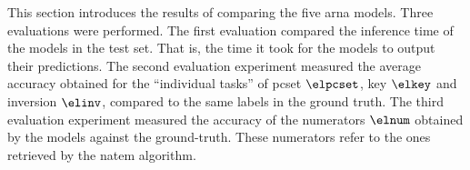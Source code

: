 
This section introduces the results of comparing the five
\gls{arna} models. Three evaluations were performed. The
first evaluation compared the inference time of the models
in the test set. That is, the time it took for the models to
output their predictions. The second evaluation experiment
measured the average accuracy obtained for the ``individual
tasks'' of \gls{pcset} $\elpcset$, key $\elkey$ and
inversion $\elinv$, compared to the same labels in the
ground truth. The third evaluation experiment measured the
accuracy of the numerators $\elnum$ obtained by the models
against the ground-truth. These numerators refer to the ones
retrieved by the \gls{natem} algorithm.

